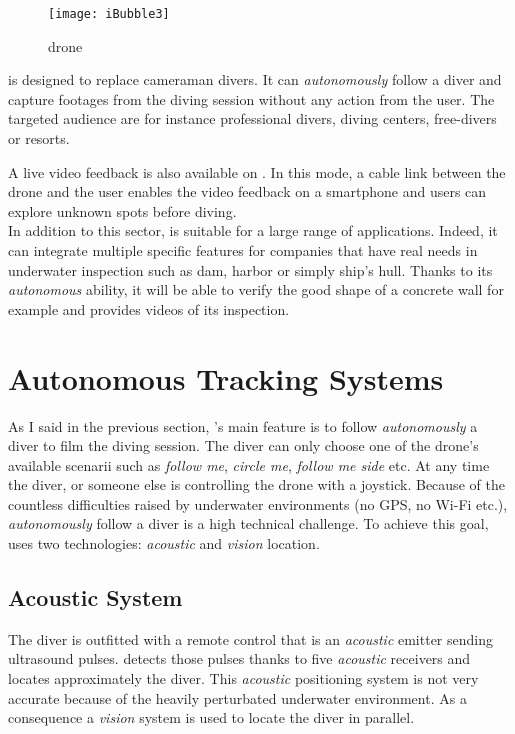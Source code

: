 \begin{figure}[h]
\centering
\texttt{[image: iBubble3]}
\caption{\iBubble{} drone}
\end{figure}


\iBubble{} is designed to replace cameraman divers. It can \emph{autonomously} follow a diver and capture footages from the diving session without any action from the user. The targeted  audience are for instance professional divers, diving centers, free-divers or resorts.

A live video feedback is also available on \iBubble. In this mode, a cable link between the drone and the user enables the video feedback on a smartphone and users can explore unknown spots before diving.\\


In addition to this  sector, \iBubble{} is suitable for a large range of  applications. Indeed, it can integrate multiple specific features for companies that have real needs in underwater inspection such as dam, harbor or simply ship's hull. Thanks to its \emph{autonomous} ability, it will be able to verify the good shape of a concrete wall for example and provides videos of its inspection.


\section{Autonomous Tracking Systems}

As I said in the previous section, \iBubble's main feature is to follow \emph{autonomously} a diver to film the diving session. The diver can only choose one of the drone's available scenarii such as \emph{follow me}, \emph{circle me}, \emph{follow me side} etc. At any time the diver, or someone else is controlling the drone with a joystick. Because of the countless difficulties raised by underwater environments (no GPS, no Wi-Fi etc.), \emph{autonomously} follow a diver is a high technical challenge. To achieve this goal, \iBubble{} uses two technologies: \emph{acoustic} and \emph{vision} location.


\subsection{Acoustic System}

The diver is outfitted with a remote control that is an \emph{acoustic} emitter sending ultrasound pulses. \iBubble{} detects those pulses thanks to five \emph{acoustic} receivers and locates approximately the diver. This \emph{acoustic} positioning system is not very accurate because of the heavily perturbated underwater environment. As a consequence a \emph{vision} system is used to locate the diver in parallel.


